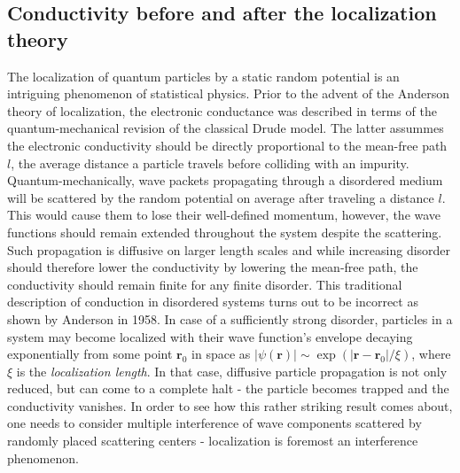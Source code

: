 \documentclass[10pt,a4paper]{article}
\begin{document}
\subsection{Conductivity before and after the localization theory }
The localization of quantum particles by a static random potential is an intriguing phenomenon of statistical physics. Prior to the advent of the Anderson theory of localization, the electronic conductance was described in terms of the quantum-mechanical revision of the classical Drude model. The latter assummes the electronic conductivity should be directly proportional to the mean-free path $l$, the average distance a particle travels before colliding with an impurity. Quantum-mechanically, wave packets propagating through a disordered medium will be scattered by the random potential on average after traveling a distance $l$. This would cause them to lose their well-defined momentum, however, the wave functions should remain extended throughout the system despite the scattering. Such propagation is diffusive on larger length scales and while increasing disorder should therefore lower the conductivity by lowering the mean-free path, the conductivity should remain finite for any finite disorder. This traditional description of conduction in disordered systems turns out to be incorrect as shown by Anderson in 1958. In case of a sufficiently strong disorder, particles in a system may become localized with their wave function's envelope decaying exponentially from some point $\mathbf{r}_0$ in space as $|\psi(\mathbf{r})| \sim \exp\left(|\mathbf{r} - \mathbf{r}_0 |/\xi \right)$, where $\xi$ is the \emph{localization length}. In that case, diffusive particle propagation is not only reduced, but can come to a complete halt - the particle becomes trapped and the conductivity vanishes. In order to see how this rather striking result comes about, one needs to consider multiple interference of wave components scattered by randomly placed scattering centers - localization is foremost an interference phenomenon.
\end{document}
